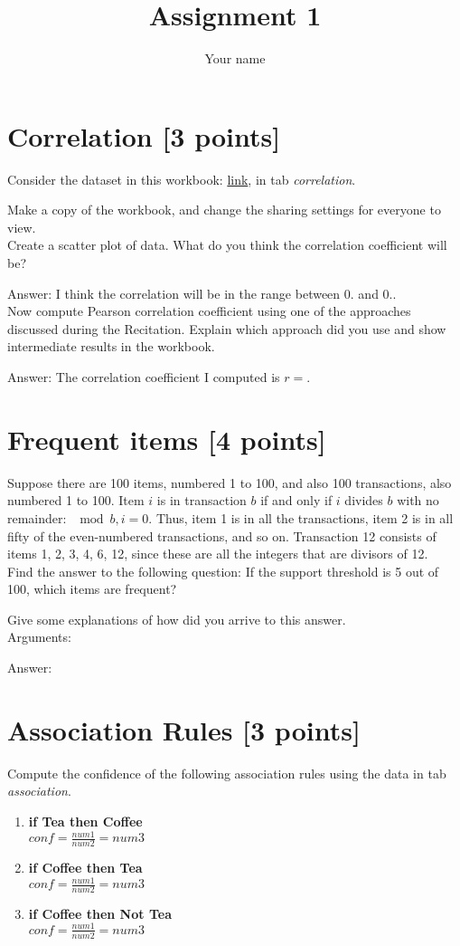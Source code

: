 \documentclass{article}
\title{Assignment 1}
\author{Your name}
\begin{document}
\maketitle


\section{Correlation [3 points]}
Consider the dataset in this workbook:
\href{https://docs.google.com/spreadsheets/d/1wMSp2pQDvF64spFXlWUCd9H6N8GVtmsWD3-NTqDV74s/edit?usp=sharing}{link}, in tab \emph{correlation}.

Make a copy of the workbook, and change the sharing settings for everyone to view.\\

Create a scatter plot of data. What do you think the correlation coefficient will be?

Answer: I think the correlation will be in the range between $0.$ and $0.$.\\

Now compute Pearson correlation coefficient using one of the approaches discussed during the Recitation. Explain which approach did you use and show intermediate results in the workbook.

Answer: The correlation coefficient I computed is $r=$. 

\newpage
\section{Frequent items [4 points]}
Suppose there are 100 items, numbered 1 to 100, and also 100
transactions, also numbered 1 to 100. Item $i$ is in transaction $b$ if and only if $i$ divides $b$
with no remainder: $\mod{b,i}=0$. Thus, item 1 is in all the transactions, item 2 is in all fifty of the
even-numbered transactions, and so on. Transaction 12 consists of items {1, 2, 3, 4, 6, 12},
since these are all the integers that are divisors of 12.\\ 

Find the answer to the following question:
If the support threshold is 5 out of 100, which items are frequent?

Give some explanations of how did you arrive to this answer.\\

Arguments:

Answer: 

\newpage
\section{Association Rules [3 points]}
Compute the confidence of the following association rules using the data in tab \emph{association}.
\begin{enumerate}
    \item \textbf{if Tea then Coffee}\\ $conf=\frac{num1}{num2}=num3$
    \item \textbf{if Coffee then Tea}\\ $conf=\frac{num1}{num2}=num3$
    \item \textbf{if Coffee then Not Tea}\\ $conf=\frac{num1}{num2}=num3$
\end{enumerate}
\end{document}
